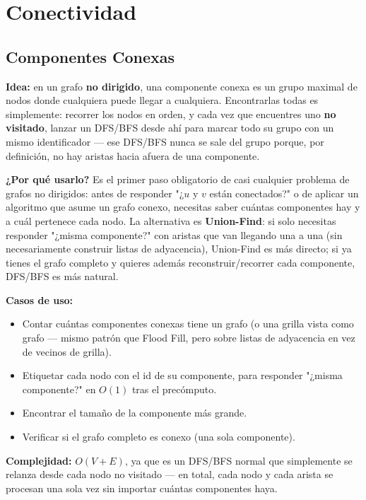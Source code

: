 \documentclass[10pt,a4paper,twocolumn]{article}
\begin{document}
\section{Conectividad}
\subsection{Componentes Conexas}

\textbf{Idea:} en un grafo \textbf{no dirigido}, una componente
conexa es un grupo maximal de nodos donde cualquiera puede llegar a
cualquiera. Encontrarlas todas es simplemente: recorrer los nodos en
orden, y cada vez que encuentres uno \textbf{no visitado}, lanzar un
DFS/BFS desde ahí para marcar todo su grupo con un mismo
identificador — ese DFS/BFS nunca se sale del grupo porque, por
definición, no hay aristas hacia afuera de una componente.

\textbf{¿Por qué usarlo?} Es el primer paso obligatorio de casi
cualquier problema de grafos no dirigidos: antes de responder
"¿$u$ y $v$ están conectados?" o de aplicar un algoritmo que asume
un grafo conexo, necesitas saber cuántas componentes hay y a cuál
pertenece cada nodo. La alternativa es \textbf{Union-Find}: si solo
necesitas responder "¿misma componente?" con aristas que van
llegando una a una (sin necesariamente construir listas de
adyacencia), Union-Find es más directo; si ya tienes el grafo
completo y quieres además reconstruir/recorrer cada componente,
DFS/BFS es más natural.

\textbf{Casos de uso:}

\begin{itemize}
	\item Contar cuántas componentes conexas tiene un grafo (o una
	grilla vista como grafo — mismo patrón que Flood Fill, pero
	sobre listas de adyacencia en vez de vecinos de grilla).
	\item Etiquetar cada nodo con el id de su componente, para
	responder "¿misma componente?" en $O(1)$ tras el precómputo.
	\item Encontrar el tamaño de la componente más grande.
	\item Verificar si el grafo completo es conexo (una sola
	componente).
\end{itemize}

\textbf{Complejidad:} $O(V + E)$, ya que es un DFS/BFS normal que
simplemente se relanza desde cada nodo no visitado — en total, cada
nodo y cada arista se procesan una sola vez sin importar cuántas
componentes haya.
\end{document}
